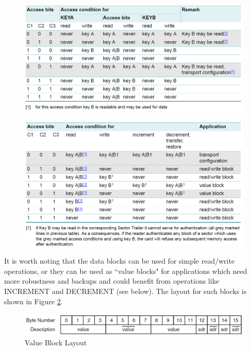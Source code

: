 \documentclass[fleqn,10pt]{SelfArx} %
\begin{document}
\begin{figure}[h]
\centering
\begin{minipage}[b]{.47\textwidth}
  \centering
  \includegraphics[width=\textwidth]{img/trailer}
  \label{fig:trailer}
\end{minipage}
\begin{minipage}[b]{.47\textwidth}
  \centering
  \includegraphics[width=\textwidth]{img/data}
  \label{fig:data}
\end{minipage}
\end{figure}

It is worth noting that the data blocks can be used for simple read/write operations, or they can be used as ``value blocks" for applications which need more robustness and backups and could benefit from operations like INCREMENT and DECREMENT (see below). The layout for such blocks is shown in Figure \ref{fig:value}.

\begin{figure}[h]
  \hfill\includegraphics[width=0.7\linewidth]{img/value} \hspace*{\fill}
  \caption{Value Block Layout}
  \label{fig:value}
\end{figure}
\end{document}
